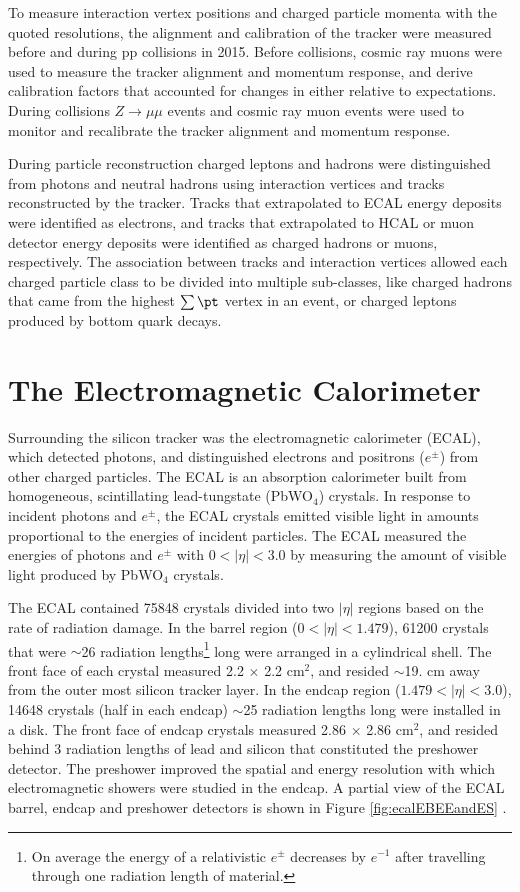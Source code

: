To measure interaction vertex positions and charged particle momenta with the quoted resolutions, the alignment and calibration 
of the tracker were measured before and during pp collisions in 2015.  Before collisions, cosmic ray muons were 
used to measure the tracker alignment and momentum response, and derive calibration factors that accounted for 
changes in either relative to expectations.  During collisions $Z \rightarrow \mu\mu$ events and cosmic ray muon events 
were used to monitor and recalibrate the tracker alignment and momentum response.

During particle reconstruction charged leptons and hadrons were distinguished from photons and neutral hadrons using 
interaction vertices and tracks reconstructed by the tracker.  Tracks that extrapolated to ECAL energy deposits were 
identified as electrons, and tracks that extrapolated to HCAL or muon detector energy deposits were identified as charged 
hadrons or muons, respectively.  The association between tracks and interaction vertices allowed each charged particle class 
to be divided into multiple sub-classes, like charged hadrons that came from the highest $\sum \pt$ vertex in an event, 
or charged leptons produced by bottom quark decays.


\section{The Electromagnetic Calorimeter}
\label{sec:ecalDescription}
Surrounding the silicon tracker was the electromagnetic calorimeter (ECAL), which detected photons, and distinguished
electrons and positrons ($e^{\pm}$) from other charged particles.  
The ECAL is an absorption calorimeter built from homogeneous, scintillating lead-tungstate (PbWO$_{4}$) crystals.  
In response to incident photons and $e^{\pm}$, the ECAL crystals emitted visible light in amounts proportional to 
the energies of incident particles.  The ECAL measured the energies of photons and $e^{\pm}$ with $0 < |\eta| < 3.0$ by 
measuring the amount of visible light produced by PbWO$_{4}$ crystals.

The ECAL contained 75848 crystals divided into two $|\eta|$ regions based on the rate of radiation 
damage.  In the barrel region ($0 < |\eta| < 1.479$), 61200 
crystals that were $\sim$26 radiation lengths\footnote{On average the energy of a relativistic $e^{\pm}$ decreases by $e^{-1}$ after 
travelling through one radiation length of material.} long were arranged in a cylindrical shell.  The front face of 
each crystal measured 2.2 $\times$ 2.2 cm$^{2}$, and resided $\sim$19. cm away from the outer most silicon tracker layer.  
In the endcap region ($1.479 < |\eta| < 3.0$), 14648 crystals (half in each 
endcap) $\sim$25 radiation lengths long were installed in a disk.  The front face of endcap crystals measured 2.86 
$\times$ 2.86 cm$^{2}$, and resided behind 3 radiation lengths of lead and silicon that constituted the preshower detector.  
The preshower improved the spatial and energy resolution with 
which electromagnetic showers were studied in the endcap.  A partial view of the ECAL barrel, endcap and 
preshower detectors is shown in Figure \ref{fig:ecalEBEEandES} \cite{ecalTDR}.

